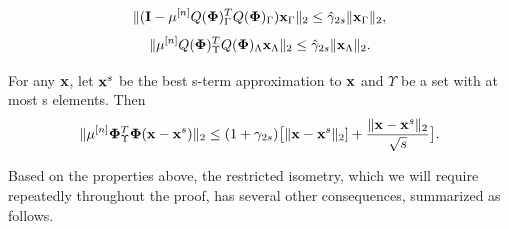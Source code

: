 \documentclass{article}
\begin{document}
\begin{equation}\label{1-q_mu*phi*phi}
    \| ( {\bf I}- \mu^{[n]}Q({\bf {\bf \Phi}})_{\Gamma}^TQ({\bf {\bf \Phi}})_{\Gamma}){\bf x}_{\Gamma}\|_2 \leq \hat{\gamma}_{2s}\|{\bf x}_{\Gamma} \|_2,
\end{equation}
\begin{equation}\label{q_mu*phi1*phi2}
    \| \mu^{[n]}Q({\bf {\bf \Phi}})_{\Upsilon}^TQ({\bf {\bf \Phi}})_{\Lambda}{\bf x}_{\Lambda}\|_2 \leq \hat{\gamma}_{2s}\|{\bf x}_{\Lambda} \|_2.
\end{equation}
\begin{lemma} \label{residual_lemma}
{\rm{\cite{blumensath2010niht}}}
For any ${\bf x}$, let ${\bf x}^s$ be the best s-term approximation to ${\bf x}$ and $\Upsilon$ be a set with at most s elements. Then
\begin{equation}\label{residual_x_bound}
\|\mu^{[n]}{\bf \Phi}^T_{\Upsilon} {\bf \Phi} ({\bf x}-{\bf x}^s)\|_2 \leq (1+\gamma_{2s})\big [\|{\bf x}-{\bf x}^s\|_2 ]+ \frac{\|{\bf x}-{\bf x}^s\|_2}{\sqrt{s}}\big].
\end{equation}
\end{lemma}
Based on the properties above, the restricted isometry, which we will require repeatedly throughout the proof, has several other consequences, summarized as follows.
\end{document}
